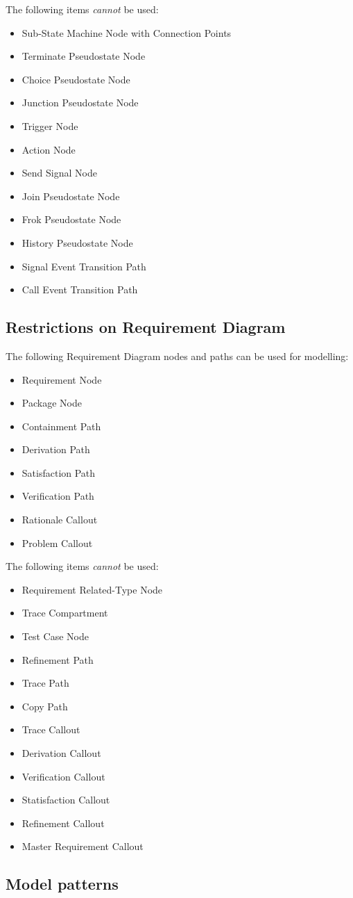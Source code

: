 The following items \emph{cannot} be used:
\begin{itemize}
\item Sub-State Machine Node with Connection Points
\item Terminate Pseudostate Node
\item Choice Pseudostate Node
\item Junction Pseudostate Node
\item Trigger Node
\item Action Node
\item Send Signal Node
\item Join Pseudostate Node
\item Frok Pseudostate Node
\item History Pseudostate Node
\item Signal Event Transition Path
\item Call Event Transition Path
\end{itemize}

\subsection{Restrictions on Requirement Diagram}

The following Requirement Diagram nodes and paths can be used for
modelling:
\begin{itemize}
\item Requirement Node
\item Package Node
\item Containment Path
\item Derivation Path
\item Satisfaction Path
\item Verification Path
\item Rationale Callout
\item Problem Callout
\end{itemize}

The following items \emph{cannot} be used:
\begin{itemize}
\item Requirement Related-Type Node
\item Trace Compartment
\item Test Case Node
\item Refinement Path
\item Trace Path
\item Copy Path
\item Trace Callout
\item Derivation Callout
\item Verification Callout
\item Statisfaction Callout
\item Refinement Callout
\item Master Requirement Callout
\end{itemize}



\subsection{Model patterns}



\begin{comment}
Example of patterns to use.

\end{comment}


